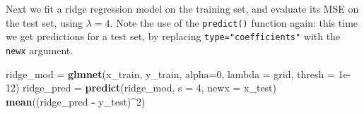 \documentclass[openany]{book}
\newenvironment{Shaded}{\begin{snugshade}}{\end{snugshade}}
\newcommand{\DataTypeTok}[1]{\textcolor[rgb]{0.13,0.29,0.53}{#1}}
\newcommand{\DecValTok}[1]{\textcolor[rgb]{0.00,0.00,0.81}{#1}}
\newcommand{\FloatTok}[1]{\textcolor[rgb]{0.00,0.00,0.81}{#1}}
\newcommand{\KeywordTok}[1]{\textcolor[rgb]{0.13,0.29,0.53}{\textbf{#1}}}
\newcommand{\NormalTok}[1]{#1}
\newcommand{\OperatorTok}[1]{\textcolor[rgb]{0.81,0.36,0.00}{\textbf{#1}}}
\newcommand{\StringTok}[1]{\textcolor[rgb]{0.31,0.60,0.02}{#1}}
\begin{document}
\begin{Shaded}
\end{Shaded}

Next we fit a ridge regression model on the training set, and evaluate
its MSE on the test set, using \(\lambda = 4\). Note the use of the \texttt{predict()}
function again: this time we get predictions for a test set, by replacing
\texttt{type="coefficients"} with the \texttt{newx} argument.

\begin{Shaded}
\begin{Highlighting}[]
\NormalTok{ridge_mod =}\StringTok{ }\KeywordTok{glmnet}\NormalTok{(x_train, y_train, }\DataTypeTok{alpha=}\DecValTok{0}\NormalTok{, }\DataTypeTok{lambda =}\NormalTok{ grid, }\DataTypeTok{thresh =} \FloatTok{1e-12}\NormalTok{)}
\NormalTok{ridge_pred =}\StringTok{ }\KeywordTok{predict}\NormalTok{(ridge_mod, }\DataTypeTok{s =} \DecValTok{4}\NormalTok{, }\DataTypeTok{newx =}\NormalTok{ x_test)}
\KeywordTok{mean}\NormalTok{((ridge_pred }\OperatorTok{-}\StringTok{ }\NormalTok{y_test)}\OperatorTok{^}\DecValTok{2}\NormalTok{)}
\end{Highlighting}
\end{Shaded}
\end{document}
